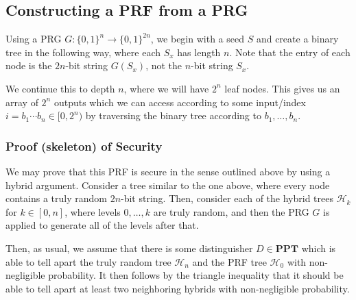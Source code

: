 \documentclass[11pt]{article}
\newcommand{\PPT}{\mathbf{PPT}}
\newcommand{\mcH}{\mathcal{H}}
\begin{document}
\subsection{Constructing a PRF from a PRG}
Using a PRG \(G:\{0,1\}^n\to\{0,1\}^{2n}\), we begin with a seed \(S\) and create a binary tree in the following way, where each \(S_{x}\) has length \(n\). Note that the entry of each node is the \(2n\)-bit string \(G(S_x)\), not the \(n\)-bit string \(S_x\).
\begin{center}
\end{center}

We continue this to depth \(n\), where we will have \(2^n\) leaf nodes. This gives us an array of \(2^n\) outputs which we can access according to some input/index \(i=b_1\cdots b_n\in[0,2^n)\) by traversing the binary tree according to \(b_1,\ldots,b_n\).

\subsubsection{Proof (skeleton) of Security}
We may prove that this PRF is secure in the sense outlined above by using a hybrid argument. Consider a tree similar to the one above, where every node contains a truly random \(2n\)-bit string. Then, consider each of the hybrid trees \(\mcH_k\) for \(k\in[0,n]\), where levels \(0,\ldots,k\) are truly random, and then the PRG \(G\) is applied to generate all of the levels after that.\medskip

Then, as usual, we assume that there is some distinguisher \(D\in\PPT\) which is able to tell apart the truly random tree \(\mcH_n\) and the PRF tree \(\mcH_0\) with non-negligible probability. It then follows by the triangle inequality that it should be able to tell apart at least two neighboring hybrids with non-negligible probability. \medskip
\end{document}
